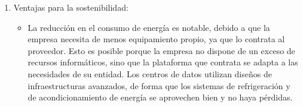 \documentclass[a4paper, 12pt]{report}
\begin{document}
\begin{justify}
\begin{enumerate}[label=\alph*)]
\begin{itemize}
				\end{itemize}
    \item{Ventajas para la sostenibilidad:} 
				\begin{itemize}
						\item{}La reducción en el consumo de energ\'ia es notable, debido a que la empresa necesita de menos equipamiento propio, ya que lo contrata al proveedor. Esto es posible porque la empresa no dispone de un exceso de recursos inform\'aticos, sino que la plataforma que contrata se adapta a las necesidades de su entidad. Los centros de datos utilizan diseños de infraestructuras avanzados, de forma que los sistemas de refrigeraci\'on y de acondicionamiento de energ\'ia se aprovechen bien y no haya p\'erdidas.
				\end{itemize}
\end{enumerate}
\end{justify}
\newpage
\end{document}
